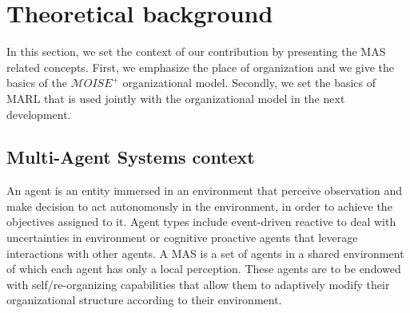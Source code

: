 \documentclass[runningheads]{llncs}
\begin{document}

\section{Theoretical background}





In this section, we set the context of our contribution by presenting the MAS related concepts. First, we emphasize the place of organization and we give the basics of the $\mathcal{M}OISE^+$ organizational model. Secondly, we set the basics of MARL that is used jointly with the organizational model in the next development.

\subsection{Multi-Agent Systems context}


An agent is an entity immersed in an environment that perceive observation and make decision to act autonomously in the environment, in order to achieve the objectives assigned to it.
Agent types include event-driven reactive to deal with uncertainties in environment or cognitive proactive agents that leverage interactions with other agents. A MAS is a set of agents in a shared environment of which each agent has only a local perception. These agents are to be endowed with self/re-organizing capabilities that allow them to adaptively modify their organizational structure according to their environment.
\end{document}
